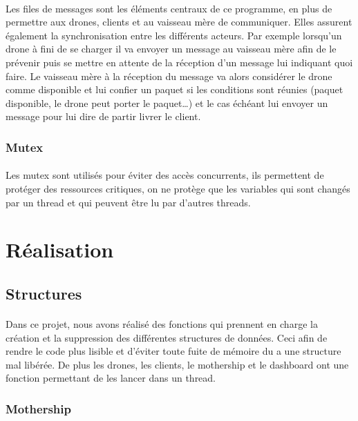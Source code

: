\documentclass[article, backcover, french, nodocumentinfo]{upmethodology-document}
\begin{document}
				\paragraph*{}
					Les files de messages sont les éléments centraux de ce programme, en plus de permettre aux drones, clients et au vaisseau mère de communiquer. Elles assurent également la synchronisation entre les différents acteurs. Par exemple lorsqu'un drone à fini de se charger il va envoyer un message au vaisseau mère afin de le prévenir puis se mettre en attente de la réception d'un message lui indiquant quoi faire. Le vaisseau mère à la réception du message va alors considérer le drone comme disponible et lui confier un paquet si les conditions sont réunies (paquet disponible, le drone peut porter le paquet\ldots) et le cas échéant lui envoyer un message pour lui dire de partir livrer le client.
			\subsubsection{Mutex}
				\paragraph*{}
					Les mutex sont utilisés pour éviter des accès concurrents, ils permettent de protéger des ressources critiques, on ne protège que les variables qui sont changés par un thread et qui peuvent être lu par d'autres threads.
	\section{Réalisation}
		\subsection{Structures}
			\paragraph*{}
				Dans ce projet, nous avons réalisé des fonctions qui prennent en charge la création et la suppression des différentes structures de données. Ceci afin de rendre le code plus lisible et d'éviter toute fuite de mémoire du a une structure mal libérée. De plus les drones, les clients, le mothership et le dashboard ont une fonction permettant de les lancer dans un thread.
			\subsubsection{Mothership}
\end{document}
